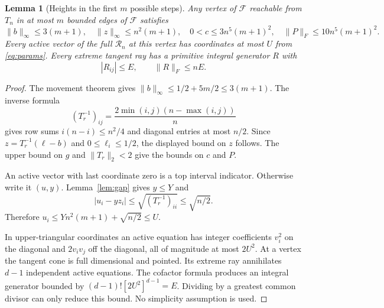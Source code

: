 \documentclass[11pt]{article}
\newtheorem{lemma}[theorem]{Lemma}
\theoremstyle{remark}\newtheorem{remark}[theorem]{Remark}
\newcommand{\Ry}{\mathcal R}\newcommand{\tr}{\operatorname{tr}}
\newcommand{\norm}[1]{\lVert #1\rVert}
\begin{document}
\begin{lemma}[Heights in the first $m$ possible steps]\label{lem:heights}
Any vertex of $\mathcal F$ reachable from $T_n$ in at most $m$ bounded edges of $\mathcal F$ satisfies
\[
 \norm b_\infty\le3(m+1),\quad
 \norm z_\infty\le n^2(m+1),\quad
 0<c\le3n^5(m+1)^2,\quad
 \norm P_F\le10n^5(m+1)^2.
\]
Every active vector of the full $\Ry_n$ at this vertex has coordinates at most $U$ from \eqref{eq:params}. Every extreme tangent ray has a primitive integral generator $R$ with
\begin{equation}\label{eq:rayheight}
 |R_{ij}|\le E,\qquad \norm R_F\le nE.
\end{equation}
\end{lemma}
\begin{proof}
The movement theorem gives $\norm b_\infty\le1/2+5m/2\le3(m+1)$. The inverse formula
\[
 (T_r^{-1})_{ij}=\frac{2\min(i,j)(n-\max(i,j))}{n}
\]
gives row sums $i(n-i)\le n^2/4$ and diagonal entries at most $n/2$. Since $z=T_r^{-1}(\ell-b)$ and $0\le\ell_i\le1/2$, the displayed bound on $z$ follows. The upper bound on $g$ and $\norm{T_r}_2<2$ give the bounds on $c$ and $P$.

An active vector with last coordinate zero is a top interval indicator. Otherwise write it $(u,y)$. Lemma~\ref{lem:gap} gives $y\le Y$ and
\[
 |u_i-yz_i|\le\sqrt{(T_r^{-1})_{ii}}\le\sqrt{n/2}.
\]
Therefore $u_i\le Yn^2(m+1)+\sqrt{n/2}\le U$.

In upper-triangular coordinates an active equation has integer coefficients $v_i^2$ on the diagonal and $2v_iv_j$ off the diagonal, all of magnitude at most $2U^2$. At a vertex the tangent cone is full dimensional and pointed. Its extreme ray annihilates $d-1$ independent active equations. The cofactor formula produces an integral generator bounded by $(d-1)![2U^2]^{d-1}=E$. Dividing by a greatest common divisor can only reduce this bound. No simplicity assumption is used.
\end{proof}
\end{document}
